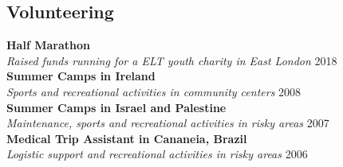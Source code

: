 \documentclass[margin]{res}
\begin{document}
\begin{resume}
\section{Volunteering}
\textbf{Half Marathon} \\ \textit{Raised funds running for a ELT youth charity in East London} \hfill 2018 \\
\textbf{Summer Camps in Ireland} \\ \textit{Sports and recreational activities in community centers} \hfill 2008 \\
\textbf{Summer Camps in Israel and Palestine} \\ \textit{Maintenance, sports and recreational activities in risky areas} \hfill 2007 \\
\textbf{Medical Trip Assistant in Cananeia, Brazil} \\ \textit{Logistic support and recreational activities in risky areas} \hfill 2006 \\

\end{resume} 
\end{document}
